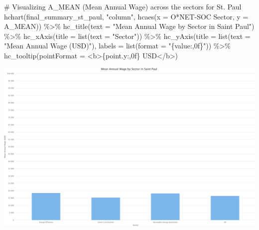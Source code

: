 \documentclass[
  letterpaper,
  DIV=11,
  numbers=noendperiod]{scrartcl}
\newenvironment{Shaded}{\begin{snugshade}}{\end{snugshade}}
\newcommand{\AttributeTok}[1]{\textcolor[rgb]{0.40,0.45,0.13}{#1}}
\newcommand{\CommentTok}[1]{\textcolor[rgb]{0.37,0.37,0.37}{#1}}
\newcommand{\FunctionTok}[1]{\textcolor[rgb]{0.28,0.35,0.67}{#1}}
\newcommand{\NormalTok}[1]{\textcolor[rgb]{0.00,0.23,0.31}{#1}}
\newcommand{\SpecialCharTok}[1]{\textcolor[rgb]{0.37,0.37,0.37}{#1}}
\newcommand{\StringTok}[1]{\textcolor[rgb]{0.13,0.47,0.30}{#1}}
\begin{document}
\begin{Shaded}
\begin{Highlighting}[]
\CommentTok{\# Visualizing A\_MEAN (Mean Annual Wage) across the sectors for St. Paul}
\FunctionTok{hchart}\NormalTok{(final\_summary\_st\_paul, }\StringTok{"column"}\NormalTok{, }\FunctionTok{hcaes}\NormalTok{(}\AttributeTok{x =} \StringTok{\textasciigrave{}}\AttributeTok{O*NET{-}SOC Sector}\StringTok{\textasciigrave{}}\NormalTok{, }\AttributeTok{y =}\NormalTok{ A\_MEAN)) }\SpecialCharTok{\%\textgreater{}\%}
  \FunctionTok{hc\_title}\NormalTok{(}\AttributeTok{text =} \StringTok{"Mean Annual Wage by Sector in Saint Paul"}\NormalTok{) }\SpecialCharTok{\%\textgreater{}\%}
  \FunctionTok{hc\_xAxis}\NormalTok{(}\AttributeTok{title =} \FunctionTok{list}\NormalTok{(}\AttributeTok{text =} \StringTok{"Sector"}\NormalTok{)) }\SpecialCharTok{\%\textgreater{}\%}
  \FunctionTok{hc\_yAxis}\NormalTok{(}\AttributeTok{title =} \FunctionTok{list}\NormalTok{(}\AttributeTok{text =} \StringTok{"Mean Annual Wage (USD)"}\NormalTok{), }\AttributeTok{labels =} \FunctionTok{list}\NormalTok{(}\AttributeTok{format =} \StringTok{"\{value:,0f\}"}\NormalTok{)) }\SpecialCharTok{\%\textgreater{}\%}
  \FunctionTok{hc\_tooltip}\NormalTok{(}\AttributeTok{pointFormat =} \StringTok{\textquotesingle{}\textless{}b\textgreater{}\{point.y:,0f\} USD\textless{}/b\textgreater{}\textquotesingle{}}\NormalTok{)}
\end{Highlighting}
\end{Shaded}

\includegraphics{index_files/figure-pdf/unnamed-chunk-21-3.pdf}
\end{document}

